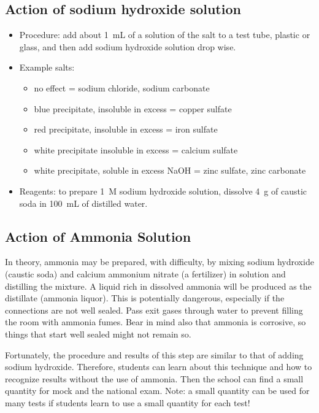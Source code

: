 \subsection{Action of sodium hydroxide solution}
\begin{itemize}
\item{Procedure: add about 1~mL of a solution of the salt to a test tube, 
plastic or glass, 
and then add sodium hydroxide solution drop wise.}
\item{Example salts:}
\begin{itemize}
\item{no effect = sodium chloride, 
sodium carbonate}
\item{blue precipitate, 
insoluble in excess = copper sulfate}
\item{red precipitate, 
insoluble in excess = iron sulfate}
\item{white precipitate insoluble in excess = calcium sulfate}
\item{white precipitate, 
soluble in excess NaOH = zinc sulfate, 
zinc carbonate}
\end{itemize}
\item{Reagents: to prepare 1~M sodium hydroxide solution, 
dissolve 4~g of caustic soda in 100~mL of distilled water.}
\end{itemize}

\subsection{Action of Ammonia Solution}
In theory, 
ammonia may be prepared, 
with difficulty, 
by mixing sodium hydroxide (caustic soda) 
and calcium ammonium nitrate (a fertilizer) in solution 
and distilling the mixture. 
A liquid rich in dissolved ammonia will be produced 
as the distillate (ammonia liquor). 
This is potentially dangerous, 
especially if the connections are not well sealed. 
Pass exit gases through water to prevent filling the room 
with ammonia fumes. 
Bear in mind also that ammonia is corrosive, 
so things that start well sealed might not remain so. 

Fortunately, 
the procedure and results of this step are similar 
to that of adding sodium hydroxide. 
Therefore, 
students can learn about this technique 
and how to recognize results without the use of ammonia. 
Then the school can find a small quantity for mock and the national exam.
Note: a small quantity can be used for many tests 
if students learn to use a small quantity for each test!

